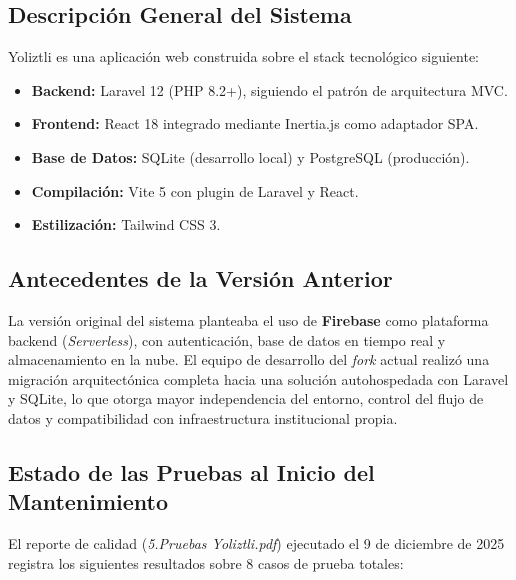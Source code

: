 \subsection{Descripción General del Sistema}

Yoliztli es una aplicación web construida sobre el stack tecnológico siguiente:

\begin{itemize}
    \item \textbf{Backend:} Laravel 12 (PHP 8.2+), siguiendo el patrón de arquitectura MVC.
    \item \textbf{Frontend:} React 18 integrado mediante Inertia.js como adaptador SPA.
    \item \textbf{Base de Datos:} SQLite (desarrollo local) y PostgreSQL (producción).
    \item \textbf{Compilación:} Vite 5 con plugin de Laravel y React.
    \item \textbf{Estilización:} Tailwind CSS 3.
\end{itemize}

\subsection{Antecedentes de la Versión Anterior}

La versión original del sistema planteaba el uso de \textbf{Firebase} como plataforma
backend (\textit{Serverless}), con autenticación, base de datos en tiempo real y
almacenamiento en la nube. El equipo de desarrollo del \textit{fork} actual realizó una
migración arquitectónica completa hacia una solución autohospedada con Laravel y SQLite,
lo que otorga mayor independencia del entorno, control del flujo de datos y
compatibilidad con infraestructura institucional propia.

\subsection{Estado de las Pruebas al Inicio del Mantenimiento}

El reporte de calidad (\textit{5.Pruebas Yoliztli.pdf}) ejecutado el 9 de diciembre de 2025
registra los siguientes resultados sobre 8 casos de prueba totales:


